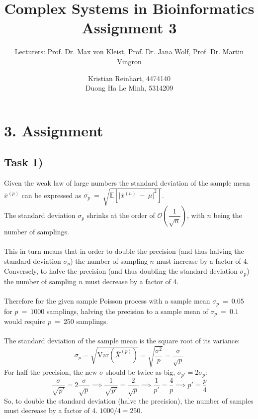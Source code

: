 \documentclass[]{scrartcl}
\title{Complex Systems in Bioinformatics \\ \vspace{2mm} Assignment 3 \\ \vspace{2mm}}
\subtitle{Lecturers: Prof. Dr. Max von Kleist, Prof. Dr. Jana Wolf, Prof. Dr. Martin Vingron}
\author{Kristian Reinhart, 4474140 \\ Duong Ha Le Minh, 5314209}
\begin{document}
\maketitle




\section*{3. Assignment}


\subsection*{Task 1)}

Given the weak law of large numbers the standard deviation of the sample mean $\overline{x}^{(p)}$ can be expressed as
$\sigma_{p} ~ = ~ \sqrt{\mathbb{E} \left[ { \vert \overline{x}^{(n)} ~ - ~ \mu \vert }^{2} \right] }$.
\\
The standard deviation $\sigma_{p}$ shrinks at the order of $\mathcal{O} \left( \dfrac{1}{\sqrt{n}} \right)$, with $n$ being the number of samplings.
\\
\\
This in turn means that in order to double the precision (and thus halving the standard deviation $\sigma_{p}$) the number of sampling $n$ must increase by a factor of 4.
Conversely, to halve the precision (and thus doubling the standard deviation $\sigma_{p}$) the number of sampling $n$ must decrease by a factor of 4.
\\
\\
Therefore for the given sample Poisson process with a sample mean  $\sigma_{p}~=~0.05$ for $p~=~1000$ samplings, halving the precision to a sample mean of  $\sigma_{p}~=~0.1$ would require $p~=~250$ samplings. 
\\
\\
The standard deviation of the sample mean is the square root of its variance:
\[
\sigma_p = \sqrt{\text{Var}(\overline{X}^{(p)})} = \sqrt{\frac{\sigma^2}{p}} = \frac{\sigma}{\sqrt{p}}
\]
For half the precision, the new $\sigma$ should be twice as big,
$\sigma_{p'} = 2 \sigma_p$:
\[
\frac{\sigma}{\sqrt{p'}} = 2 \frac{\sigma}{\sqrt{p}} \implies \frac{1}{\sqrt{p'}} = \frac{2}{\sqrt{p}} \implies \frac{1}{p'} = \frac{4}{p} \implies p' = \frac{p}{4}
\]
So, to double the standard deviation (halve the precision), the number of samples must decrease by a factor of 4. $1000 / 4 = 250$.
\end{document}
